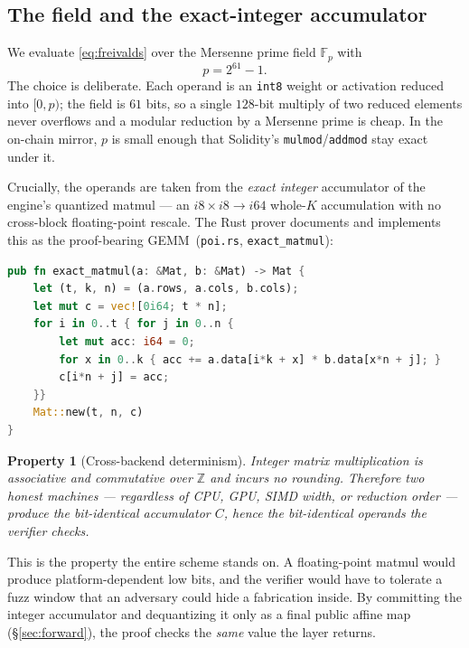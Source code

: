 \documentclass[11pt,a4paper]{article}
\newtheorem{property}{Property}
\begin{document}
\subsection{The field and the exact-integer accumulator}

We evaluate \eqref{eq:freivalds} over the Mersenne prime field $\mathbb{F}_p$ with
\begin{equation}
  p = 2^{61} - 1 .
\end{equation}
The choice is deliberate. Each operand is an \texttt{int8} weight or activation reduced into $[0,p)$; the field is $61$ bits, so a single $128$-bit multiply of two reduced elements never overflows and a modular reduction by a Mersenne prime is cheap. In the on-chain mirror, $p$ is small enough that Solidity's \texttt{mulmod}/\texttt{addmod} stay exact under it.

Crucially, the operands are taken from the \emph{exact integer} accumulator of the engine's quantized matmul --- an $i8 \times i8 \to i64$ whole-$K$ accumulation with no cross-block floating-point rescale. The Rust prover documents and implements this as the proof-bearing GEMM~(\texttt{poi.rs}, \texttt{exact\_matmul}):

\begin{lstlisting}[language=Rust,caption={The exact-integer matmul; identical in Go (\texttt{crypto/poi.ExactMatmul}).}]
pub fn exact_matmul(a: &Mat, b: &Mat) -> Mat {
    let (t, k, n) = (a.rows, a.cols, b.cols);
    let mut c = vec![0i64; t * n];
    for i in 0..t { for j in 0..n {
        let mut acc: i64 = 0;
        for x in 0..k { acc += a.data[i*k + x] * b.data[x*n + j]; }
        c[i*n + j] = acc;
    }}
    Mat::new(t, n, c)
}
\end{lstlisting}

\begin{property}[Cross-backend determinism]\label{prop:det}
Integer matrix multiplication is associative and commutative over $\mathbb{Z}$ and incurs no rounding. Therefore two honest machines --- regardless of CPU, GPU, SIMD width, or reduction order --- produce the bit-identical accumulator $C$, hence the bit-identical operands the verifier checks.
\end{property}

This is the property the entire scheme stands on. A floating-point matmul would produce platform-dependent low bits, and the verifier would have to tolerate a fuzz window that an adversary could hide a fabrication inside. By committing the integer accumulator and dequantizing it only as a final public affine map (\S\ref{sec:forward}), the proof checks the \emph{same} value the layer returns.
\end{document}
